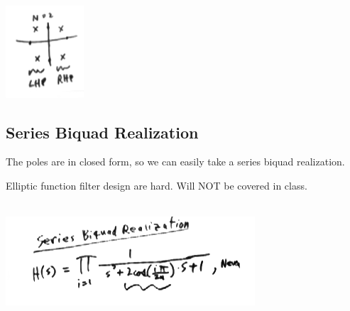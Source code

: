   
\\
\includegraphics[scale=0.9]{frames/15i}


\subsection*{Series Biquad Realization}

The poles are in closed form, so we can easily take a series biquad realization.


Elliptic function filter design are hard. Will NOT be covered in class. 


\\
\includegraphics[scale=0.9]{frames/15j}\\
